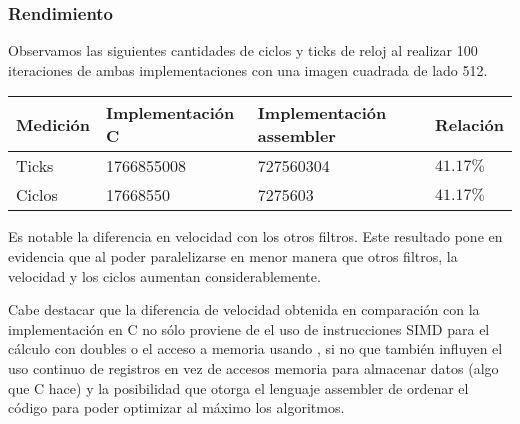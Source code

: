 \subsubsection{Rendimiento}

Observamos las siguientes cantidades de ciclos y ticks de reloj al realizar 100 iteraciones de ambas implementaciones con una imagen cuadrada de lado 512.
\begin{center}
    \begin{tabular}{|l|l|l|l|}
        \hline
        Medición & Implementación C & Implementación assembler & Relación \\
        \hline
        Ticks    & 1766855008      & 727560304               & $41.17\%$ \\
        Ciclos   & 17668550       & 7275603                & $41.17\%$ \\
        \hline
    \end{tabular}
\end{center}

Es notable la diferencia en velocidad con los otros filtros. Este resultado pone en evidencia que al poder paralelizarse en menor manera que otros filtros, la velocidad y los ciclos aumentan considerablemente.

Cabe destacar que la diferencia de velocidad obtenida en comparación con la implementación en C no sólo proviene de el uso de instrucciones SIMD para el cálculo con doubles o el acceso a memoria usando , si no que también influyen el uso continuo de registros en vez de accesos memoria para almacenar datos (algo que C hace) y la posibilidad que otorga el lenguaje assembler de ordenar el código para poder optimizar al máximo los algoritmos.